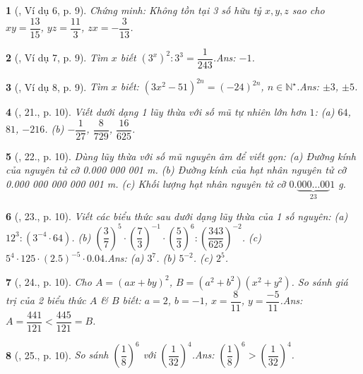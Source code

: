 \documentclass{article}
\newtheorem{baitoan}{}
\begin{document}
\begin{baitoan}[\cite{Tuyen_Toan_7}, Ví dụ 6, p. 9]
	Chứng minh: Không tồn tại 3 số hữu tỷ $x,y,z$ sao cho $xy = \dfrac{13}{15}$, $yz = \dfrac{11}{3}$, $zx = -\dfrac{3}{13}$.
\end{baitoan}

\begin{baitoan}[\cite{Tuyen_Toan_7}, Ví dụ 7, p. 9]
	Tìm $x$ biết $(3^x)^2:3^3 = \dfrac{1}{243}$.\hfill{\sf Ans: $-1$.}
\end{baitoan}

\begin{baitoan}[\cite{Tuyen_Toan_7}, Ví dụ 8, p. 9]
	Tìm $x$ biết: $(3x^2 - 51)^{2n} = (-24)^{2n}$, $n\in\mathbb{N}^\star$.\hfill{\sf Ans: $\pm3$, $\pm5$.}
\end{baitoan}

\begin{baitoan}[\cite{Tuyen_Toan_7}, 21., p. 10]
	Viết dưới dạng 1 lũy thừa với số mũ tự nhiên lớn hơn $1$: (a) $64$, $81$, $-216$. (b) $-\dfrac{1}{27}$, $\dfrac{8}{729}$, $\dfrac{16}{625}$.
\end{baitoan}

\begin{baitoan}[\cite{Tuyen_Toan_7}, 22., p. 10]
	Dùng lũy thừa với số mũ nguyên âm để viết gọn: (a) Đường kính của nguyên tử cỡ {\rm0.000 000 001 m}. (b) Đường kính của hạt nhân nguyên tử cỡ {\rm0.000 000 000 000 001 m}. (c) Khối lượng hạt nhân nguyên tử cỡ $0.\underbrace{000\ldots 00}_{23}1$ {\rm g}.
\end{baitoan}

\begin{baitoan}[\cite{Tuyen_Toan_7}, 23., p. 10]
	Viết các biểu thức sau dưới dạng lũy thừa của 1 số nguyên: (a) $12^3:(3^{-4}\cdot 64)$. (b) $\left(\dfrac{3}{7}\right)^5\cdot\left(\dfrac{7}{3}\right)^{-1}\cdot\left(\dfrac{5}{3}\right)^6:\left(\dfrac{343}{625}\right)^{-2}$. (c) $5^4\cdot 125\cdot(2.5)^{-5}\cdot 0.04$.\hfill{\sf Ans: (a) $3^7$. (b) $5^{-2}$. (c) $2^5$.}
\end{baitoan}

\begin{baitoan}[\cite{Tuyen_Toan_7}, 24., p. 10]
	Cho $A = (ax + by)^2$, $B = (a^2 + b^2)(x^2 + y^2)$. So sánh giá trị của 2 biểu thức $A$ \& $B$ biết: $a = 2$, $b = -1$, $x = \dfrac{8}{11}$, $y = \dfrac{-5}{11}$.\hfill{\sf Ans: $A = \dfrac{441}{121} < \dfrac{445}{121} = B$.}
\end{baitoan}

\begin{baitoan}[\cite{Tuyen_Toan_7}, 25., p. 10]
	So sánh $\left(\dfrac{1}{8}\right)^6$ với $\left(\dfrac{1}{32}\right)^4$.\hfill{\sf Ans: $\left(\dfrac{1}{8}\right)^6 > \left(\dfrac{1}{32}\right)^4$.}
\end{baitoan}
\end{document}
